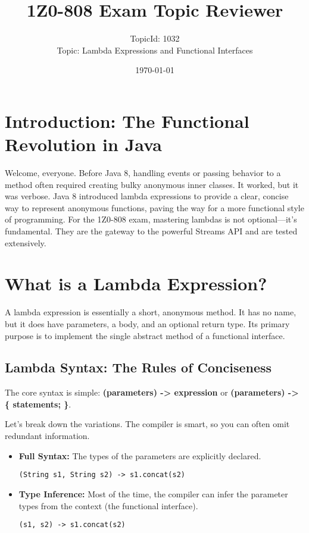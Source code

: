 \documentclass[12pt]{article}
\title{\textbf{1Z0-808 Exam Topic Reviewer}}
\author{TopicId: 1032 \\ Topic: Lambda Expressions and Functional Interfaces}
\date{\today}
\begin{document}
\maketitle
\newpage\begin{enumerate}[label=(\arabic*)]
\section*{Introduction: The Functional Revolution in Java}
Welcome, everyone. Before Java 8, handling events or passing behavior to a method often required creating bulky anonymous inner classes. It worked, but it was verbose. Java 8 introduced lambda expressions to provide a clear, concise way to represent anonymous functions, paving the way for a more functional style of programming. For the 1Z0-808 exam, mastering lambdas is not optional---it's fundamental. They are the gateway to the powerful Streams API and are tested extensively.

\section{What is a Lambda Expression?}
A lambda expression is essentially a short, anonymous method. It has no name, but it does have parameters, a body, and an optional return type. Its primary purpose is to implement the single abstract method of a functional interface.

\subsection{Lambda Syntax: The Rules of Conciseness}
The core syntax is simple: \textbf{(parameters) -> expression} or \textbf{(parameters) -> \{ statements; \}}.

Let's break down the variations. The compiler is smart, so you can often omit redundant information.
\begin{itemize}
    \item \textbf{Full Syntax:} The types of the parameters are explicitly declared.
    \begin{verbatim}
(String s1, String s2) -> s1.concat(s2)
    \end{verbatim}

    \item \textbf{Type Inference:} Most of the time, the compiler can infer the parameter types from the context (the functional interface).
    \begin{verbatim}
(s1, s2) -> s1.concat(s2)
    \end{verbatim}


\end{itemize}
\end{enumerate}
\end{document}
